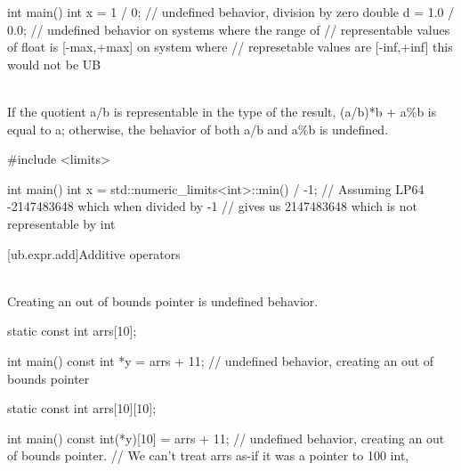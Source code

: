 {\pnum
\begin{example}
\begin{codeblock}
int main() {
  int x = 1 / 0;        // undefined behavior, division by zero
  double d = 1.0 / 0.0; // undefined behavior on systems where the range of
                        // representable values of float is [-max,+max] on system where
                        // represetable values are [-inf,+inf] this would not be UB
}
\end{codeblock}
\end{example}

\pnum
{} \\
If the
quotient a/b is representable in the type of the result, (a/b)*b + a\%b is equal to a; otherwise, the behavior
of both a/b and a\%b is undefined.

\pnum
\begin{example}
\begin{codeblock}
#include <limits>

int main() {
  int x =
      std::numeric_limits<int>::min() / -1; // Assuming LP64 -2147483648 which when divided by -1
                                            // gives us 2147483648 which is not representable by int
}
\end{codeblock}
\end{example}

[ub.expr.add]{Additive operators}

\pnum
{} \\
Creating an out of bounds pointer is undefined behavior.

\pnum
\begin{example}
\begin{codeblock}
static const int arrs[10]{};

int main() {
  const int *y = arrs + 11;             // undefined behavior, creating an out of bounds pointer
}
\end{codeblock}
\end{example}

\begin{example}
\begin{codeblock}
static const int arrs[10][10]{};

int main() {
  const int(*y)[10] = arrs + 11;        // undefined behavior, creating an out of bounds pointer.
                                        // We can't treat arrs as-if it was a pointer to 100 int,
}
\end{codeblock}
\end{example}

}
